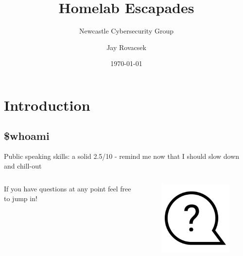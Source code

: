 \documentclass{beamer}
\title[Or how my wife learnt about my ability to wreck a home network]{Homelab Escapades}
\subtitle{Newcastle Cybersecurity Group}
\author[Jay Rovacsek]{Jay Rovacsek}
\date{\today}
\begin{document}
\begin{frame}
\maketitle
\end{frame}

\section{Introduction}
\subsection{\$whoami}

\begin{frame}
    \begin{center}
        Public speaking skills: a solid 2.5/10 - remind me now that I should slow down and chill-out
    \end{center}
\end{frame}

\begin{frame}
    \begin{columns}
        \begin{column}{0.5\textwidth}
            If you have questions at any point feel free to jump in! 
        \end{column}
        \begin{column}{0.5\textwidth}
            \begin{figure}
                \centering
                \includegraphics[width=\textwidth,keepaspectratio]{../resources/question.png}
            \end{figure}
        \end{column}
    \end{columns}
\end{frame}
\end{document}
